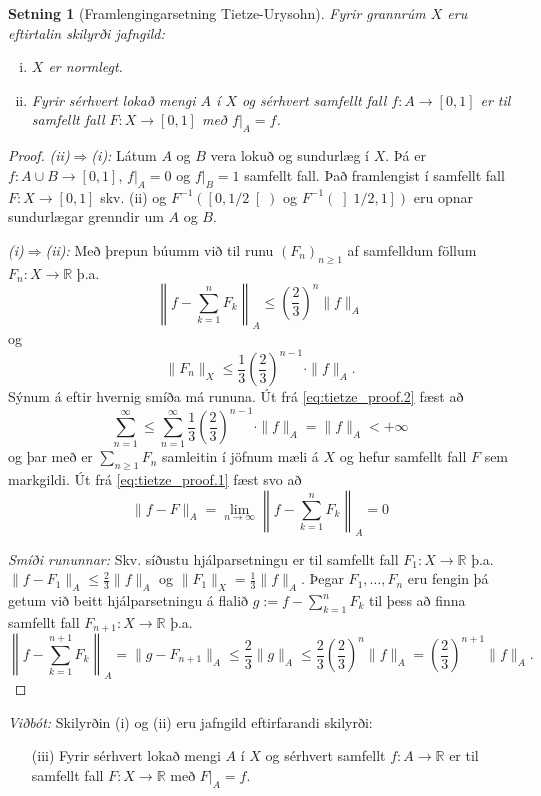 \documentclass[a4paper,icelandic]{book}
\theoremstyle{definition}
\theoremstyle{plain}
\newtheorem{setn}{Setning}[section]
\theoremstyle{remark}
\newcommand{\R}{\mathbb{R}} %
\begin{document}
\begin{setn}
  [Framlengingarsetning Tietze-Urysohn]
  Fyrir grannrúm $X$ eru eftirtalin skilyrði jafngild: 
  \begin{enumerate}[(i)]
    \item $X$ er normlegt.
    \item Fyrir sérhvert lokað mengi $A$ í $X$ og sérhvert samfellt
      fall $f:A\to\left[ 0,1 \right]$ er til samfellt fall $F:X\to\left[
      0,1 \right]$ með $f|_A = f$.
  \end{enumerate}
\end{setn}
\begin{proof} 
  \emph{(ii)$\Rightarrow$(i):} Látum $A$ og $B$ vera lokuð og sundurlæg
  í $X$. Þá er $f:A\cup B\to\left[ 0,1 \right]$, $f|_A=0$ og $f|_B=1$
  samfellt fall. Það framlengist í samfellt fall $F:X\to\left[ 0,1
  \right]$ skv. (ii) og $F^{-1}(\left[ 0,1/2 \right[)$ og
  $F^{-1}(\left] 1/2,1 \right])$ eru opnar sundurlægar grenndir um $A$
  og $B$.

  \emph{(i)$\Rightarrow$(ii):} Með þrepun búumm við til runu
  $(F_n)_{n\geq 1}$ af samfelldum föllum $F_n : X\to\R$ þ.a. 
  \begin{equation}
    \left\| f - \sum_{k=1}^n F_k \right\|_A
    \leq
    \left( \frac 23 \right)^n \|f\|_A
    \label{eq:tietze_proof.1}
  \end{equation}
  og
  \begin{equation}
    \|F_n\|_X
    \leq \frac 13 \left( \frac 23 \right)^{n-1}\cdot\|f\|_A
    \label{eq:tietze_proof.2}.
  \end{equation}
  Sýnum á eftir hvernig smíða má rununa.
  Út frá \eqref{eq:tietze_proof.2} fæst að\[
  \sum_{n=1}^{\infty}
  \leq \sum_{n=1}^{\infty}\frac 13\left( \frac 23
    \right)^{n-1}\cdot\|f\|_A
  = \|f\|_A
  < +\infty
  \]
  og þar með er $\sum_{n\geq 1} F_n$ samleitin í jöfnum mæli á $X$ og
  hefur samfellt fall $F$ sem markgildi. Út frá
  \eqref{eq:tietze_proof.1} fæst svo að \[
  \|f-F\|_A
  = \lim_{n\to\infty} \left\| f - \sum_{k=1}^{n}F_k\right\|_A
  = 0
  \]

  \emph{Smíði rununnar:} Skv. síðustu hjálparsetningu er til samfellt
  fall $F_1 : X\to\R$ þ.a. $\|f-F_1\|_A\leq\frac 23\|f\|_A$ og
  $\|F_1\|_X=\frac 13\|f\|_A$. Þegar $F_1,\dots,F_n$ eru fengin þá getum
  við beitt hjálparsetningu á flalið $g:= f-\sum_{k=1}^{n}F_k$ til þess
  að finna samfellt fall $F_{n+1}:X\to\R$ þ.a.\[
  \left\|f-\sum_{k=1}^{n+1} F_k \right\|_A
  = \|g-F_{n+1}\|_A
  \leq \frac 23 \|g\|_A
  \leq \frac 23\left( \frac 23 \right)^n \|f\|_A
  = \left( \frac 23 \right)^{n+1} \|f\|_A.
  \]
\end{proof}
\emph{Viðbót:} Skilyrðin (i) og (ii) eru jafngild eftirfarandi skilyrði:
\begin{itemize}
  \item[(iii)] Fyrir sérhvert lokað mengi $A$ í $X$ og sérhvert
    samfellt $f:A\to\R$ er til samfellt fall $F:X\to\R$ með $F|_A = f$.
\end{itemize}
\end{document}
